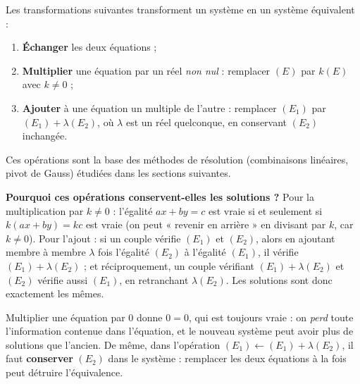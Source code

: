 \documentclass[11pt]{article}
\begin{document}
\begin{propriete}
Les transformations suivantes transforment un système en un système équivalent :
\begin{enumerate}
\item \textbf{Échanger} les deux équations ;
\item \textbf{Multiplier} une équation par un réel \emph{non nul} : remplacer $(E)$ par $k(E)$ avec $k \neq 0$ ;
\item \textbf{Ajouter} à une équation un multiple de l'autre : remplacer $(E_1)$ par $(E_1) + \lambda (E_2)$, où $\lambda$ est un réel quelconque, en conservant $(E_2)$ inchangée.
\end{enumerate}
Ces opérations sont la base des méthodes de résolution (combinaisons linéaires, pivot de Gauss) étudiées dans les sections suivantes.
\end{propriete}

\textbf{Pourquoi ces opérations conservent-elles les solutions ?} Pour la multiplication par $k \neq 0$ : l'égalité $ax + by = c$ est vraie si et seulement si $k(ax + by) = kc$ est vraie (on peut « revenir en arrière » en divisant par $k$, car $k \neq 0$). Pour l'ajout : si un couple vérifie $(E_1)$ et $(E_2)$, alors en ajoutant membre à membre $\lambda$ fois l'égalité $(E_2)$ à l'égalité $(E_1)$, il vérifie $(E_1) + \lambda(E_2)$ ; et réciproquement, un couple vérifiant $(E_1) + \lambda(E_2)$ et $(E_2)$ vérifie aussi $(E_1)$, en retranchant $\lambda(E_2)$. Les solutions sont donc exactement les mêmes.

\begin{attention}
Multiplier une équation par $0$ donne $0 = 0$, qui est toujours vraie : on \emph{perd} toute l'information contenue dans l'équation, et le nouveau système peut avoir plus de solutions que l'ancien. De même, dans l'opération $(E_1) \leftarrow (E_1) + \lambda(E_2)$, il faut \textbf{conserver} $(E_2)$ dans le système : remplacer les deux équations à la fois peut détruire l'équivalence.
\end{attention}
\end{document}
